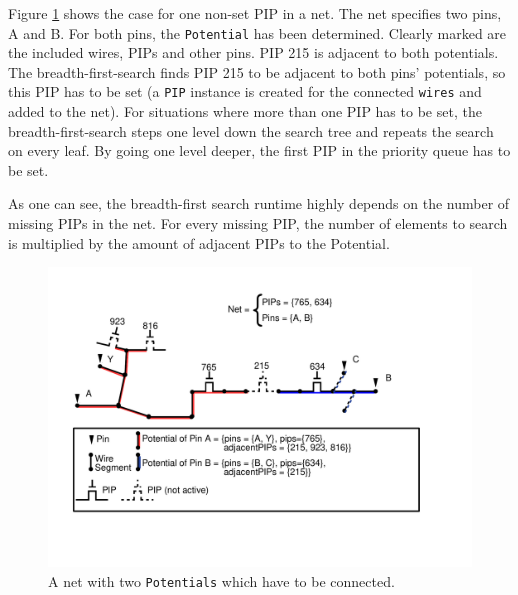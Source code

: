 Figure \ref{fig:brokenpotentials} shows the case for one non-set PIP in a net. The net specifies two pins, A and B. For both pins, the \texttt{Potential} has been determined. Clearly marked are the included wires, PIPs and other pins. PIP 215 is adjacent to both potentials. The breadth-first-search finds PIP 215 to be adjacent to both pins' potentials, so this PIP has to be set (a \texttt{PIP} instance is created for the connected \texttt{wires} and added to the net). For situations where more than one PIP has to be set, the breadth-first-search steps one level down the search tree and repeats the search on every leaf. By going one level deeper, the first PIP in the priority queue has to be set.

As one can see, the breadth-first search runtime highly depends on the number of missing PIPs in the net. For every missing PIP, the number of elements to search is multiplied by the amount of adjacent PIPs to the Potential.

\begin{figure}[h]
\centering
\includegraphics[scale=0.65]{images/brokenpotentials.pdf}
\caption{A net with two \texttt{Potentials} which have to be connected.}
\label{fig:brokenpotentials}
\end{figure}



